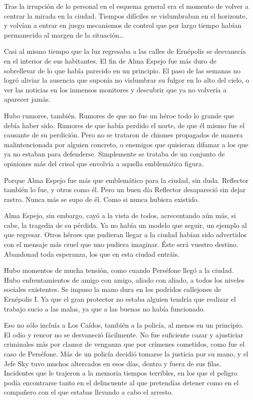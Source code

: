 Tras la irrupción de lo personal en el esquema general era el momento de volver a centrar la mirada en la ciudad. Tiempos difíciles se vislumbraban en el horizonte, y volvían a entrar en juego mecanismos de control que por largo tiempo habían permanecido al margen de la situación\dots

\fancyparbreak
Casi al mismo tiempo que la luz regresaba a las calles de Ernépolis se desvanecía en el interior de sus habitantes. El fin de Alma Espejo fue más duro de sobrellevar de lo que había parecido en un principio. El paso de las semanas no logró aliviar la ausencia que suponía no vislumbrar su fulgor en lo alto del cielo, o ver las noticias en los inmensos monitores y descubrir que ya no volvería a aparecer jamás.

Hubo rumores, también. Rumores de que no fue un héroe todo lo grande que debía haber sido. Rumores de que había perdido el norte, de que él mismo fue el causante de su perdición. Pero no se trataron de chismes propagados de manera malintencionada por alguien concreto, o enemigos que quisieran difamar a los que ya no estaban para defenderse. Simplemente se trataba de un conjunto de opiniones más del crisol que envolvía a aquella emblemática figura.

Porque Alma Espejo fue más que emblemático para la ciudad, sin duda. Reflector también lo fue, y otros como él. Pero un buen día Reflector desapareció sin dejar rastro. Nunca más se supo de él. Como si nunca hubiera existido.

Alma Espejo, sin embargo, cayó a la vista de todos, acrecentando aún más, si cabe, la tragedia de su pérdida. Ya no había un modelo que seguir, un ejemplo al que regresar. Otros héroes que pudieran llegar a la ciudad habían sido advertidos con el mensaje más cruel que uno pudiera imaginar. Éste será vuestro destino. Abandonad toda esperanza, los que en esta ciudad entráis.

Hubo momentos de mucha tensión, como cuando Perséfone llegó a la ciudad. Hubo enfrentamientos de amigo con amigo, aliado con aliado, a todos los niveles sociales existentes. Se impuso la mano dura en los podridos callejones de Ernépolis I. Ya que el gran protector no estaba alguien tendría que realizar el trabajo sucio a las malas, ya que a las buenas no había funcionado.

Eso no sólo incluía a Los Caídos, también a la policía, al menos en un principio. El odio y rencor no se desvaneció fácilmente. No fue suficiente cazar y ajusticiar criminales más por clamor de venganza que por crímenes cometidos, como fue el caso de Perséfone. Más de un policía decidió tomarse la justicia por su mano, y el Jefe Sky tuvo muchos altercados en esos días, dentro y fuera de sus filas. Incidentes que le trajeron a la memoria tiempos terribles, en los que el peligro podía encontrarse tanto en el delincuente al que pretendías detener como en el compañero con el que estabas llevando a cabo el arresto.

